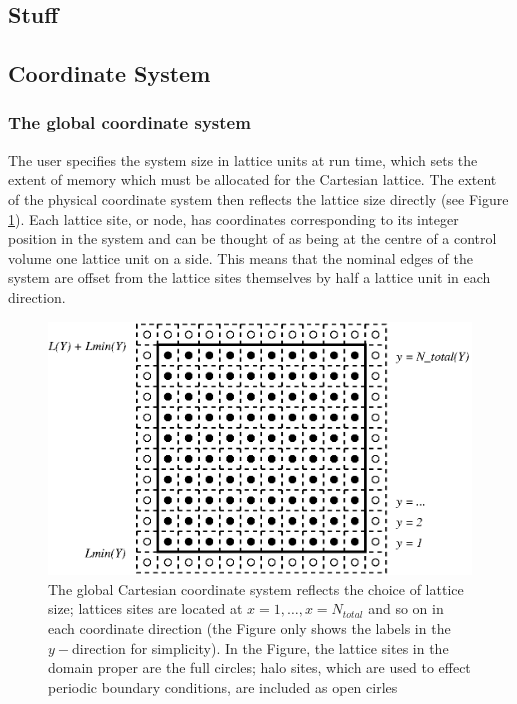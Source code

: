 \subsection{Stuff}

\subsection{Coordinate System}

\subsubsection{The global coordinate system}

The user specifies the system size in lattice units at run time,
which sets the extent of memory which must be allocated for the
Cartesian lattice. The extent of the physical coordinate system
then reflects the lattice size directly (see Figure \ref{fig_c1}). 
Each lattice site, or node,  has coordinates corresponding to its
integer position in the system and can be thought of as being
at the centre of a control volume one lattice unit on a side.
This means that the nominal edges of the
system are offset from the lattice sites themselves by half a
lattice unit in each direction.


\begin{figure}[h]
\begin{center}
\includegraphics{xfig/fig_c1.eps}
\end{center}
\caption{The global Cartesian coordinate system reflects the choice
of lattice size; lattices sites are located at
$x=1, \ldots, x = N_{total}$ and so on in each coordinate direction
(the Figure only shows the labels in the $y-$direction for simplicity).
In the Figure, the lattice sites in the domain proper are the full
circles; halo sites, which are used to effect periodic boundary
conditions, are included as open cirles}
\label{fig_c1}
\end{figure}

